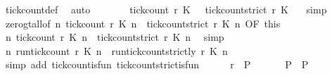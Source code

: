 \begin{isabellebody}
\ tick{\isacharunderscore}count{\isacharunderscore}def\ \isamarkupfalse%
\ auto\isanewline
\ \ \ \ \isamarkupfalse%
\ \isamarkupfalse%
\ {\isacartoucheopen}tick{\isacharunderscore}count\ r\ K\ {}\ {\isasymle}\ tick{\isacharunderscore}count{\isacharunderscore}strict\ r\ K\ {}{\isacartoucheclose}\ \isamarkupfalse%
\ simp\isanewline
\ \ \ \ \isamarkupfalse%
\ zero{\isacharunderscore}gt{\isacharunderscore}all{\isacharbrackleft}of\ {\isacartoucheopen}{\isasymlambda}n{\isachardot}\ tick{\isacharunderscore}count\ r\ K\ n\ {\isasymle}\ tick{\isacharunderscore}count{\isacharunderscore}strict\ r\ K\ n{\isacartoucheclose}{\isacharcomma}\ OF\ this\ {\isacharbrackright}\ {\isacharasterisk}\isanewline
\ \ \ \ \ \ \isamarkupfalse%
\ {\isacartoucheopen}{\isasymforall}n{\isachardot}\ {\isacharparenleft}tick{\isacharunderscore}count\ r\ K\ n{\isacharparenright}\ {\isasymle}\ {\isacharparenleft}tick{\isacharunderscore}count{\isacharunderscore}strict\ r\ K\ n{\isacharparenright}{\isacartoucheclose}\ \isamarkupfalse%
\ simp\isanewline
\ \ \ \ \isamarkupfalse%
\ {\isacartoucheopen}{\isasymforall}n{\isachardot}\ {\isacharparenleft}run{\isacharunderscore}tick{\isacharunderscore}count\ r\ K\ n{\isacharparenright}\ {\isasymle}\ {\isacharparenleft}run{\isacharunderscore}tick{\isacharunderscore}count{\isacharunderscore}strictly\ r\ K\ n{\isacharparenright}{\isacartoucheclose}\isanewline
\ \ \ \ \ \ \isamarkupfalse%
\ {\isacharparenleft}simp\ add{\isacharcolon}\ tick{\isacharunderscore}count{\isacharunderscore}is{\isacharunderscore}fun\ tick{\isacharunderscore}count{\isacharunderscore}strict{\isacharunderscore}is{\isacharunderscore}fun{\isacharparenright}\isanewline
\ \ \ \ \isamarkupfalse%
\ {\isacartoucheopen}r\ {\isasymin}\ {\isacharquery}P{\isacartoucheclose}\ \isacommand{{\isachardot}{\isachardot}}\isamarkupfalse%
\isanewline
\ \ \isacommand{{\isacharbraceright}}\isamarkupfalse%
\ \isamarkupfalse%
\ {\isacartoucheopen}{\isacharquery}P{\isacharprime}\ {\isasymsubseteq}\ {\isacharquery}P{\isacartoucheclose}\ \isacommand{{\isachardot}{\isachardot}}\isamarkupfalse%
\isanewline
{}\isamarkupfalse%
%
\endisatagproof
{\isafoldproof}%
%
\isadelimproof
%
\endisadelimproof

\end{isabellebody}
